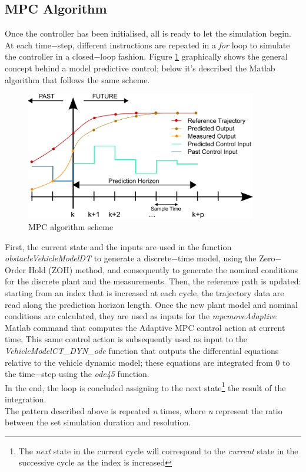 \subsection{MPC Algorithm}  
Once the controller has been initialised, all is ready to let the simulation begin.
\\At each time$-$step, different instructions are repeated in a \textit{for} loop to simulate the controller in a closed$-$loop fashion. Figure \ref{fig:MPC_scheme} graphically shows the general concept behind a model predictive control; below it's described the Matlab algorithm that follows the same scheme.
\begin{figure}[H]
    \centering
    \includegraphics[width=0.9\textwidth]{Figures/MPC_scheme_basic.png}
    \caption{MPC algorithm scheme}
    \label{fig:MPC_scheme}
\end{figure}
First, the current state and the inputs are used in the function \textit{obstacleVehicleModelDT} to generate a discrete$-$time model, using the Zero$-$Order Hold (ZOH) method, and consequently to generate the nominal conditions for the discrete plant and the measurements. Then, the reference path is updated: starting from an index that is increased at each cycle, the trajectory data are read along the prediction horizon length. Once the new plant model and nominal conditions are calculated, they are used as inputs for the \textit{mpcmoveAdaptive} Matlab command that computes the Adaptive MPC control action at current time. This same control action is subsequently used as input to the \textit{VehicleModelCT\_DYN\_ode} function that outputs the differential equations relative to the vehicle dynamic model; these equations are integrated from 0 to the time$-$step using the \textit{ode45} function.
\\In the end, the loop is concluded assigning to the next state\footnote{The \textit{next} state in the current cycle will correspond to the \textit{current} state in the successive cycle as the index is increased} the result of the integration.\\
The pattern described above is repeated \textit{n} times, where \textit{n} represent the ratio between the set simulation duration and resolution.



